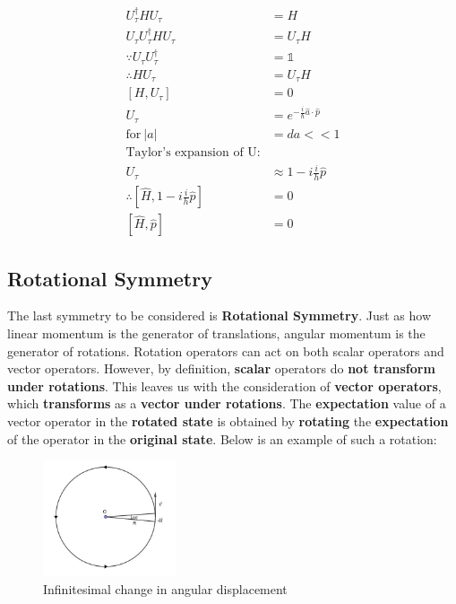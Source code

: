 \documentclass{article}
\begin{document}
\begin{flushleft}
\begin{align*}
    U^\dagger_\tau H U_\tau&=H\\
    U_\tau U^\dagger_\tau H U_\tau&=U_\tau H\\ 
    \because   U_\tau U^\dagger_\tau&=\mathbb{1}\\
    \therefore HU_\tau&=U_\tau H\\
    [H,U_\tau]&=0\\
    U_\tau&=e^{-\frac{i}{\hbar}\hat{a}\cdot\hat{p}}\\
    \text{for}\ |a|&=da<<1\\
    \text{Taylor's expansion of U:}\\
    U_\tau&\approx 1-i\frac{i}{h}\hat{p}\\
    \therefore [\hat{H},1-i\frac{i}{h}\hat{p}]&=0\\
    [\hat{H},\hat{p}]&=0
    \end{align*}

\subsection{Rotational Symmetry}

The last symmetry to be considered is \textbf{Rotational Symmetry}. Just as how linear momentum is the generator of translations, angular momentum is the generator of rotations. Rotation operators can act on both scalar operators and vector operators. However, by definition, \textbf{scalar} operators do \textbf{not transform under rotations}. This leaves us with the consideration of \textbf{vector operators}, which \textbf{transforms} as a\textbf{ vector under rotations}. The \textbf{expectation} value of a vector operator in the \textbf{rotated state} is obtained by \textbf{rotating} the \textbf{expectation} of the operator in the \textbf{original state}. Below is an example of such a rotation:

\begin{figure}[h]
    \centering
    \includegraphics[width=0.35\textwidth]{circle.jpg}
    \caption{Infinitesimal change in angular displacement}
    \end{figure}


\end{flushleft}
\end{document}

